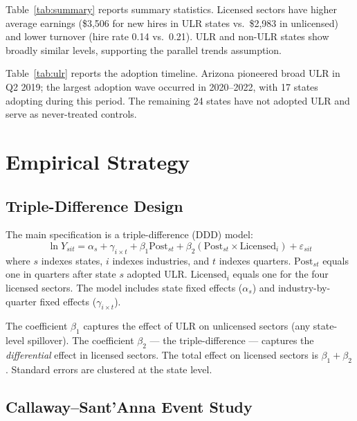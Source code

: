\documentclass[12pt]{article}
\begin{document}


Table~\ref{tab:summary} reports summary statistics. Licensed sectors have higher average earnings (\$3,506 for new hires in ULR states vs.\ \$2,983 in unlicensed) and lower turnover (hire rate 0.14 vs.\ 0.21). ULR and non-ULR states show broadly similar levels, supporting the parallel trends assumption.



Table~\ref{tab:ulr} reports the adoption timeline. Arizona pioneered broad ULR in Q2 2019; the largest adoption wave occurred in 2020--2022, with 17 states adopting during this period. The remaining 24 states have not adopted ULR and serve as never-treated controls.


\section{Empirical Strategy}
\label{sec:strategy}

\subsection{Triple-Difference Design}

The main specification is a triple-difference (DDD) model:
\begin{equation}
\ln Y_{sit} = \alpha_s + \gamma_{i \times t} + \beta_1 \text{Post}_{st} + \beta_2 (\text{Post}_{st} \times \text{Licensed}_i) + \varepsilon_{sit}
\label{eq:ddd}
\end{equation}
where $s$ indexes states, $i$ indexes industries, and $t$ indexes quarters. $\text{Post}_{st}$ equals one in quarters after state $s$ adopted ULR. $\text{Licensed}_i$ equals one for the four licensed sectors. The model includes state fixed effects ($\alpha_s$) and industry-by-quarter fixed effects ($\gamma_{i \times t}$).

The coefficient $\beta_1$ captures the effect of ULR on unlicensed sectors (any state-level spillover). The coefficient $\beta_2$ --- the triple-difference --- captures the \emph{differential} effect in licensed sectors. The total effect on licensed sectors is $\beta_1 + \beta_2$. Standard errors are clustered at the state level.

\subsection{Callaway--Sant'Anna Event Study}
\end{document}
